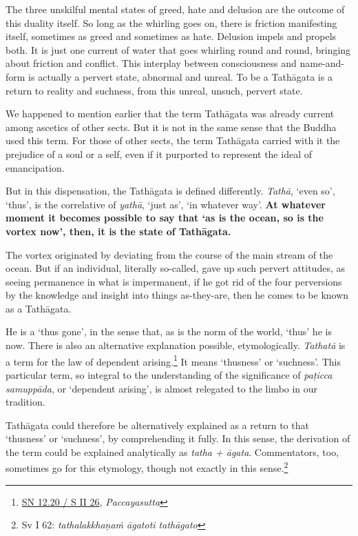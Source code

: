 The three unskilful mental states of greed, hate and delusion are the outcome of this duality itself. So long as the whirling goes on, there is friction manifesting itself, sometimes as greed and sometimes as hate. Delusion impels and propels both. It is just one current of water that goes whirling round and round, bringing about friction and conflict. This interplay between consciousness and name-and-form is actually a pervert state, abnormal and unreal. To be a Tathāgata is a return to reality and suchness, from this unreal, unsuch, pervert state.

We happened to mention earlier that the term Tathāgata was already current among ascetics of other sects. But it is not in the same sense that the Buddha used this term. For those of other sects, the term Tathāgata carried with it the prejudice of a soul or a self, even if it purported to represent the ideal of emancipation.

But in this dispensation, the Tathāgata is defined differently. \emph{Tathā}, `even so', `thus', is the correlative of \emph{yathā}, `just as', `in whatever way'. \textbf{At whatever moment it becomes possible to say that `as is the ocean, so is the vortex now', then, it is the state of Tathāgata.}

The vortex originated by deviating from the course of the main stream of the ocean. But if an individual, literally so-called, gave up such pervert attitudes, as seeing permanence in what is impermanent, if he got rid of the four perversions by the knowledge and insight into things as-they-are, then he comes to be known as a Tathāgata.

He is a `thus gone', in the sense that, as is the norm of the world, `thus' he is now. There is also an alternative explanation possible, etymologically. \emph{Tathatā} is a term for the law of dependent arising.\footnote{\href{https://suttacentral.net/sn12.20/pli/ms}{SN 12.20 / S II 26}, \emph{Paccayasutta}} It means `thusness' or `suchness'. This particular term, so integral to the understanding of the significance of \emph{paṭicca samuppāda}, or `dependent arising', is almost relegated to the limbo in our tradition.

Tathāgata could therefore be alternatively explained as a return to that `thusness' or `suchness', by comprehending it fully. In this sense, the derivation of the term could be explained analytically as \emph{tatha + āgata}. Commentators, too, sometimes go for this etymology, though not exactly in this sense.\footnote{Sv I 62: \emph{tathalakkhaṇaṁ āgatoti tathāgato}}

